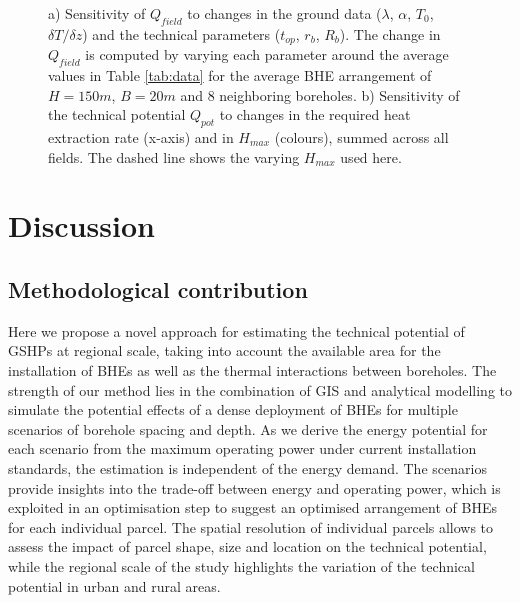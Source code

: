 \begin{figure}[tb]
\centering
{}
\caption{a) Sensitivity of $Q_{field}$ to changes in the ground data ($\lambda$, $\alpha$, $T_0$, $\delta T / \delta z$) and the technical parameters ($t_{op}$, $r_b$, $R_b$). The change in $Q_{field}$ is computed by varying each parameter around the average values in Table \ref{tab:data} for the average BHE arrangement of $H=150m$, $B=20m$ and 8 neighboring boreholes.
b) Sensitivity of the technical potential $Q_{pot}$ to changes in the required heat extraction rate (x-axis) and in $H_{max}$ (colours), summed across all fields. The dashed line shows the varying $H_{max}$ used here.}
\label{fig:sensitivity}
\end{figure}


\section{Discussion}
\label{discussion_BHE}

\subsection{Methodological contribution}

Here we propose a novel approach for estimating the technical potential of GSHPs at regional scale, taking into account the available area for the installation of BHEs as well as the thermal interactions between boreholes.
%
The strength of our method lies in the combination of GIS and analytical modelling to simulate the potential effects of a dense deployment of BHEs for multiple scenarios of borehole spacing and depth.
As we derive the energy potential for each scenario from the maximum operating power under current installation standards, the estimation is independent of the energy demand.
%
The scenarios provide insights into the trade-off between energy and operating power, which is exploited in an optimisation step to suggest an optimised arrangement of BHEs for each individual parcel. 
% 
The spatial resolution of individual parcels allows to assess the impact of parcel shape, size and location on the technical potential, while the regional scale of the study highlights the variation of the technical potential in urban and rural areas.

